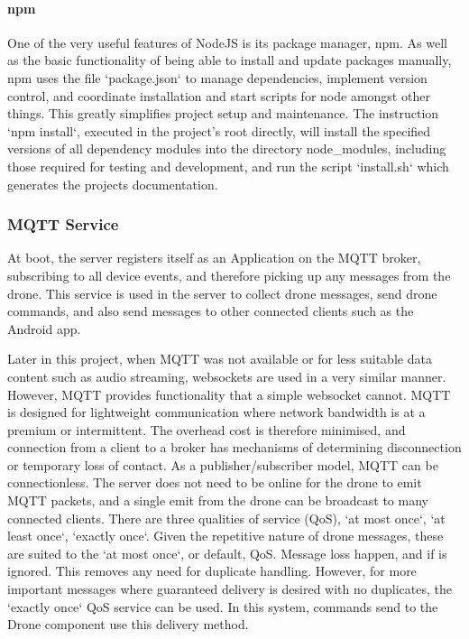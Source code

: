 \documentclass{article}
\begin{document}
\paragraph{npm}\label{npm}
One of the very useful features of NodeJS is its package manager, npm. As well as the basic functionality of being able to install and update packages manually, npm uses the file `package.json` to manage dependencies, implement version control, and coordinate installation and start scripts for node amongst other things. This greatly simplifies project setup and maintenance. The instruction `npm install`, executed in the project's root directly, will install the specified versions of all dependency modules into the directory node\_modules, including those required for testing and development, and run the script `install.sh` which generates the projects documentation.   

\subsubsection{MQTT Service}
At boot, the server registers itself as an Application on the MQTT broker, subscribing to all device events, and therefore picking up any messages from the drone. This service is used in the server to collect drone messages, send drone commands, and also send messages to other connected clients such as the Android app.

Later in this project, when MQTT was not available or for less suitable data content such as audio streaming, websockets are used in a very similar manner. However, MQTT provides functionality that a simple websocket cannot. MQTT is designed for lightweight communication where network bandwidth is at a premium or intermittent\cite{mqttSpec}. The overhead cost is therefore minimised, and connection from a client to a broker has mechanisms of determining disconnection or temporary loss of contact. As a publisher/subscriber model, MQTT can be connectionless. The server does not need to be online for the drone to emit MQTT packets, and a single emit from the drone can be broadcast to many connected clients. There are three qualities of service (QoS), `at most once`, `at least once`, `exactly once`\cite{mqttSpec}. Given the repetitive nature of drone messages, these are suited to the `at most once`, or default, QoS. Message loss happen, and if is ignored. This removes any need for duplicate handling. However, for more important messages where guaranteed delivery is desired with no duplicates, the `exactly once` QoS service can be used. In this system, commands send to the Drone component use this delivery method.
\end{document}
